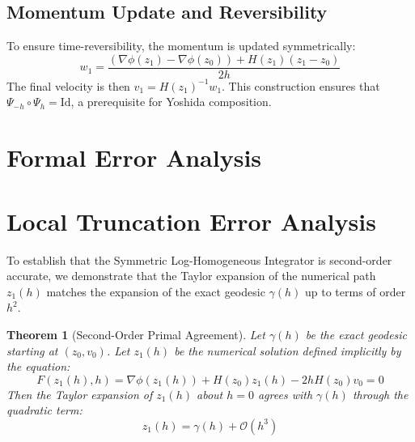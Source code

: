 \documentclass[11pt,a4paper]{article}
\newtheorem{theorem}{Theorem}
\begin{document}
\subsection{Momentum Update and Reversibility}
To ensure time-reversibility, the momentum is updated symmetrically:
\begin{equation}
    w_1 = \frac{(\nabla \phi(z_1) - \nabla \phi(z_0)) + H(z_1)(z_1 - z_0)}{2h}
\end{equation}
The final velocity is then $v_1 = H(z_1)^{-1} w_1$. This construction ensures that $\Psi_{-h} \circ \Psi_h = \text{Id}$, a prerequisite for Yoshida composition.

\section{Formal Error Analysis}





\section{Local Truncation Error Analysis}

To establish that the Symmetric Log-Homogeneous Integrator is second-order accurate, we demonstrate that the Taylor expansion of the numerical path $z_1(h)$ matches the expansion of the exact geodesic $\gamma(h)$ up to terms of order $h^2$.

\begin{theorem}[Second-Order Primal Agreement]
Let $\gamma(h)$ be the exact geodesic starting at $(z_0, v_0)$. Let $z_1(h)$ be the numerical solution defined implicitly by the equation:
\begin{equation}
    F(z_1(h), h) = \nabla \phi(z_1(h)) + H(z_0)z_1(h) - 2h H(z_0)v_0 = 0
\end{equation}
Then the Taylor expansion of $z_1(h)$ about $h=0$ agrees with $\gamma(h)$ through the quadratic term:
\begin{equation}
    z_1(h) = \gamma(h) + \mathcal{O}(h^3)
\end{equation}
\end{theorem}
\end{document}
